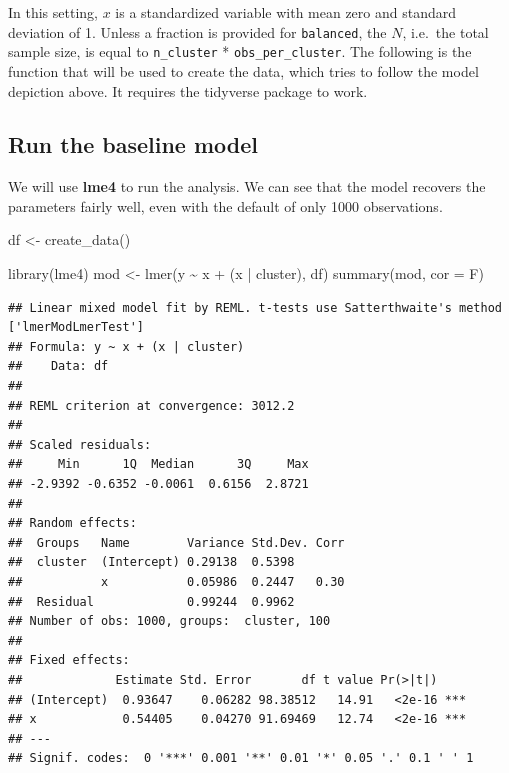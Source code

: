 \documentclass[
  12pt,
]{book}
\newenvironment{Shaded}{\begin{snugshade}}{\end{snugshade}}
\newcommand{\AttributeTok}[1]{\textcolor[rgb]{0.77,0.63,0.00}{#1}}
\newcommand{\FunctionTok}[1]{\textcolor[rgb]{0.00,0.00,0.00}{#1}}
\newcommand{\NormalTok}[1]{#1}
\newcommand{\OtherTok}[1]{\textcolor[rgb]{0.56,0.35,0.01}{#1}}
\newcommand{\SpecialCharTok}[1]{\textcolor[rgb]{0.00,0.00,0.00}{#1}}
\begin{document}
In this setting, \(x\) is a standardized variable with mean zero and standard deviation of 1. Unless a fraction is provided for \texttt{balanced}, the \(N\), i.e.~the total sample size, is equal to \texttt{n\_cluster} * \texttt{obs\_per\_cluster}. The following is the function that will be used to create the data, which tries to follow the model depiction above. It requires the tidyverse package to work.

\hypertarget{run-the-baseline-model}{%
\subsection{Run the baseline model}\label{run-the-baseline-model}}

We will use \textbf{lme4} to run the analysis. We can see that the model recovers the parameters fairly well, even with the default of only 1000 observations.

\begin{Shaded}
\begin{Highlighting}[]
\NormalTok{df }\OtherTok{\textless{}{-}} \FunctionTok{create\_data}\NormalTok{()}

\FunctionTok{library}\NormalTok{(lme4)}
\NormalTok{mod }\OtherTok{\textless{}{-}} \FunctionTok{lmer}\NormalTok{(y }\SpecialCharTok{\textasciitilde{}}\NormalTok{ x }\SpecialCharTok{+}\NormalTok{ (x }\SpecialCharTok{|}\NormalTok{ cluster), df)}
\FunctionTok{summary}\NormalTok{(mod, }\AttributeTok{cor =}\NormalTok{ F)}
\end{Highlighting}
\end{Shaded}

\begin{verbatim}
## Linear mixed model fit by REML. t-tests use Satterthwaite's method ['lmerModLmerTest']
## Formula: y ~ x + (x | cluster)
##    Data: df
## 
## REML criterion at convergence: 3012.2
## 
## Scaled residuals: 
##     Min      1Q  Median      3Q     Max 
## -2.9392 -0.6352 -0.0061  0.6156  2.8721 
## 
## Random effects:
##  Groups   Name        Variance Std.Dev. Corr
##  cluster  (Intercept) 0.29138  0.5398       
##           x           0.05986  0.2447   0.30
##  Residual             0.99244  0.9962       
## Number of obs: 1000, groups:  cluster, 100
## 
## Fixed effects:
##             Estimate Std. Error       df t value Pr(>|t|)    
## (Intercept)  0.93647    0.06282 98.38512   14.91   <2e-16 ***
## x            0.54405    0.04270 91.69469   12.74   <2e-16 ***
## ---
## Signif. codes:  0 '***' 0.001 '**' 0.01 '*' 0.05 '.' 0.1 ' ' 1
\end{verbatim}
\end{document}

